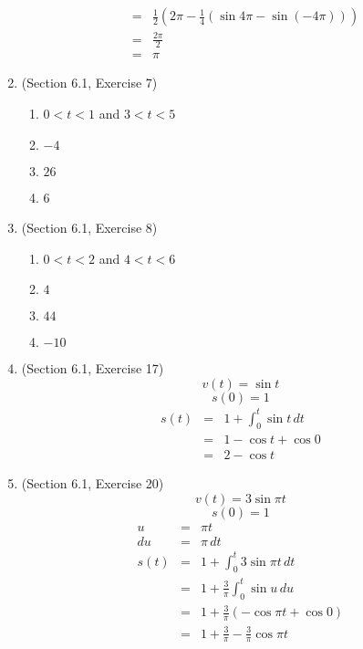 \documentclass{article}
\begin{document}
\begin{enumerate}
\begin{eqnarray}
                                                        &=& \frac{1}{2}\left(2\pi - \frac{1}{4}\left(\sin{4\pi} - \sin{\left(-4\pi\right)}\right)\right) \\
                                                        &=& \frac{2\pi}{2} \\
                                                        &=& \pi
        \end{eqnarray}
    \item (Section 6.1, Exercise 7)
        \begin{enumerate}
            \item $0 < t < 1$ and $3 < t < 5$
            \item $-4$
            \item $26$
            \item 6
        \end{enumerate}
    \item (Section 6.1, Exercise 8)
        \begin{enumerate}
            \item $0 < t < 2$ and $4 < t < 6$
            \item $4$
            \item $44$
            \item $-10$
        \end{enumerate}
    \item (Section 6.1, Exercise 17)
        $$v(t) = \sin{t}$$
        $$s(0) = 1$$
        \begin{eqnarray}
            s(t) &=& 1 + \int_0^t{\sin{t}\,dt} \\
                 &=& 1 - \cos{t} + \cos{0} \\
                 &=& 2 - \cos{t}
        \end{eqnarray}
    \item (Section 6.1, Exercise 20)
        $$v(t) = 3\sin{\pi t}$$
        $$s(0) = 1$$
        \begin{eqnarray}
            u &=& \pi t \\
            du &=& \pi\,dt \\
            s(t) &=& 1 + \int_0^t{3\sin{\pi t}\,dt} \\
                 &=& 1 + \frac{3}{\pi}\int_0^t{\sin{u}\,du} \\
                 &=& 1 + \frac{3}{\pi}\left(-\cos{\pi t} + \cos{0}\right) \\
                 &=& 1 + \frac{3}{\pi} - \frac{3}{\pi}\cos{\pi t}
        \end{eqnarray}

\end{enumerate}
\end{document}
